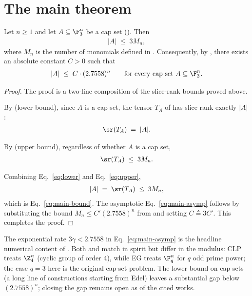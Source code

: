 \section{The main theorem}
\label{sec:main-theorem}

\begin{theorem}\label{thm:main}
Let $n \ge 1$ and let $A \subseteq \F_3^n$ be a cap set (). Then
\begin{align}\label{eq:main-bound}
|A| \;\le\; 3 M_n,
\end{align}
where $M_n$ is the number of monomials defined in . Consequently, by , there exists an absolute constant $C > 0$ such that
\begin{align}\label{eq:main-asymp}
|A| \;\le\; C \cdot (2.7558)^n \qquad \text{for every cap set } A \subseteq \F_3^n.
\end{align}
\end{theorem}

\begin{proof}
The proof is a two-line composition of the slice-rank bounds proved above.

By  (lower bound), since $A$ is a cap set, the tensor $T_A$ of  has slice rank exactly $|A|$:
\begin{align}\label{eq:lower}
\sr(T_A) \;=\; |A|.
\end{align}

By  (upper bound), regardless of whether $A$ is a cap set,
\begin{align}\label{eq:upper}
\sr(T_A) \;\le\; 3 M_n.
\end{align}

Combining Eq.~\eqref{eq:lower} and Eq.~\eqref{eq:upper},
\begin{align*}
|A| \;=\; \sr(T_A) \;\le\; 3 M_n,
\end{align*}
which is Eq.~\eqref{eq:main-bound}. The asymptotic Eq.~\eqref{eq:main-asymp} follows by substituting the bound $M_n \le C' (2.7558)^n$ from  and setting $C \triangleq 3 C'$. This completes the proof.
\end{proof}

\begin{remark}\label{rem:main-tightness}
The exponential rate $3\gamma < 2.7558$ in Eq.~\eqref{eq:main-asymp} is the headline numerical content of \cite{EllenbergGijswijt2017}. Both \cite{CrootLevPach2017} and \cite{EllenbergGijswijt2017} match in spirit but differ in the modulus: CLP treats $\Z_4^n$ (cyclic group of order $4$), while EG treats $\F_q^n$ for $q$ odd prime power; the case $q = 3$ here is the original cap-set problem. The lower bound on cap sets (a long line of constructions starting from Edel) leaves a substantial gap below $(2.7558)^n$; closing the gap remains open as of the cited works.
\end{remark}
